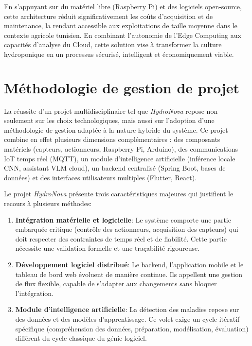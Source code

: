 	En s'appuyant sur du matériel libre (Raspberry Pi) et des logiciels open-source, cette architecture réduit significativement les coûts d'acquisition et de maintenance, la rendant accessible aux exploitations de taille moyenne dans le contexte agricole tunisien. En combinant l'autonomie de l'Edge Computing aux capacités d'analyse du Cloud, cette solution vise à transformer la culture hydroponique en un processus sécurisé, intelligent et économiquement viable.

\section{Méthodologie de gestion de projet}

La réussite d’un projet multidisciplinaire tel que \textit{HydroNova} repose non seulement sur les choix technologiques, mais aussi sur l’adoption d’une méthodologie de gestion adaptée à la nature hybride du système. Ce projet combine en effet plusieurs dimensions complémentaires : des composants matériels (capteurs, actionneurs, Raspberry Pi, Arduino), des communications IoT temps réel (MQTT), un module d’intelligence artificielle (inférence locale CNN, assistant VLM cloud), un backend centralisé (Spring Boot, bases de données) et des interfaces utilisateurs multiples (Flutter, React).

Le projet \textit{HydroNova} présente trois caractéristiques majeures qui justifient le recours à plusieurs méthodes:

\begin{enumerate}
	\item \textbf{Intégration matérielle et logicielle}: Le système comporte une partie embarquée critique (contrôle des actionneurs, acquisition des capteurs) qui doit respecter des contraintes de temps réel et de fiabilité. Cette partie nécessite une validation formelle et une traçabilité rigoureuse.
	\item \textbf{Développement logiciel distribué}: Le backend, l’application mobile et le tableau de bord web évoluent de manière continue. Ils appellent une gestion de flux flexible, capable de s’adapter aux changements sans bloquer l’intégration.
	\item \textbf{Module d’intelligence artificielle}: La détection des maladies repose sur des données et des modèles d’apprentissage. Ce volet exige un cycle itératif spécifique (compréhension des données, préparation, modélisation, évaluation) différent du cycle classique du génie logiciel.
\end{enumerate}

